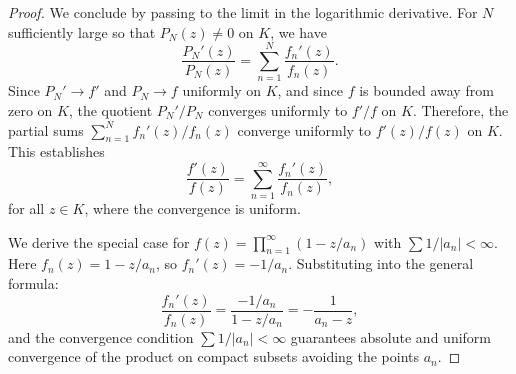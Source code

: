 \begin{proposition}
\begin{proof}
	We conclude by passing to the limit in the logarithmic derivative. For $N$ sufficiently large so that $P_N(z) \neq 0$ on $K$, we have
	$$\frac{P_N'(z)}{P_N(z)} = \sum_{n=1}^N \frac{f_n'(z)}{f_n(z)}.$$
	Since $P_N' \to f'$ and $P_N \to f$ uniformly on $K$, and since $f$ is bounded away from zero on $K$, the quotient $P_N'/P_N$ converges uniformly to $f'/f$ on $K$. Therefore, the partial sums $\sum_{n=1}^N f_n'(z)/f_n(z)$ converge uniformly to $f'(z)/f(z)$ on $K$. This establishes
	$$\frac{f'(z)}{f(z)} = \sum_{n=1}^\infty \frac{f_n'(z)}{f_n(z)},$$
	for all $z \in K$, where the convergence is uniform.

	We derive the special case for $f(z) = \prod_{n=1}^\infty (1 - z/a_n)$ with $\sum 1/|a_n| < \infty$. Here $f_n(z) = 1 - z/a_n$, so $f_n'(z) = -1/a_n$. Substituting into the general formula:
	$$\frac{f_n'(z)}{f_n(z)} = \frac{-1/a_n}{1 - z/a_n} = -\frac{1}{a_n - z},$$
	and the convergence condition $\sum 1/|a_n| < \infty$ guarantees absolute and uniform convergence of the product on compact subsets avoiding the points $a_n$.
\end{proof}
\end{proposition}